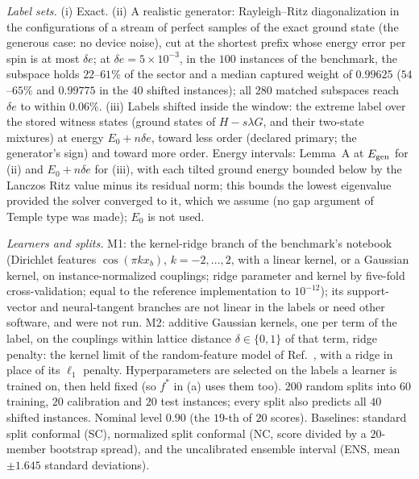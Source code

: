 \documentclass[aps,prx,onecolumn,10pt,nofootinbib,longbibliography,floatfix]{revtex4-2}
\theoremstyle{remark}
\newcommand{\de}{\delta e}
\begin{document}
\emph{Label sets.} (i) Exact. (ii) A realistic generator: Rayleigh--Ritz diagonalization in the configurations of a
stream of perfect samples of the exact ground state (the generous case: no device noise), cut at the shortest prefix
whose energy error per spin is at most $\de$; at $\de=5\times10^{-3}$, in the $100$ instances of the benchmark, the subspace holds $22$--$61\%$ of the %
sector and a median captured weight of $0.99625$ ($54$--$65\%$ and $0.99775$ in the $40$ shifted instances); all $280$ matched subspaces reach $\de$ to within %
$0.06\%$. (iii) Labels shifted inside the window: the extreme label over the stored witness states (ground states of %
$H-s\lambda G$, and their two-state mixtures) at energy $E_0+n\de$, toward less order (declared primary; the
generator's sign) and toward more order. Energy intervals: Lemma~A at $E_{\rm gen}$ for (ii) and $E_0+n\de$ for
(iii), with each tilted ground energy bounded below by the Lanczos Ritz value minus its residual norm; this bounds
the lowest eigenvalue provided the solver converged to it, which we assume (no gap argument of Temple type was
made); $E_0$ is not used.

\emph{Learners and splits.} M1: the kernel-ridge branch of the benchmark's notebook (Dirichlet features
$\cos(\pi k x_b)$, $k=-2,\dots,2$, with a linear kernel, or a Gaussian kernel, on instance-normalized couplings; %
ridge parameter and kernel by five-fold cross-validation; equal to the reference implementation to $10^{-12}$); its %
support-vector and neural-tangent branches are not linear in the labels or need other software, and were not run.
M2: additive Gaussian kernels, one per term of the label, on the couplings within lattice distance $\delta\in\{0,1\}$ %
of that term, ridge penalty: the kernel limit of the random-feature model of Ref.~\cite{lewis2024}, with a ridge in
place of its $\ell_1$ penalty. Hyperparameters are selected on the labels a learner is trained on, then held fixed
(so $f^*$ in (a) uses them too). $200$ random splits into $60$ training, $20$ calibration and $20$ test instances; %
every split also predicts all $40$ shifted instances. Nominal level $0.90$ (the $19$-th of $20$ scores). Baselines: %
standard split conformal (SC), normalized split conformal (NC, score divided by a $20$-member bootstrap spread), and %
the uncalibrated ensemble interval (ENS, mean $\pm1.645$ standard deviations). %
\end{document}
